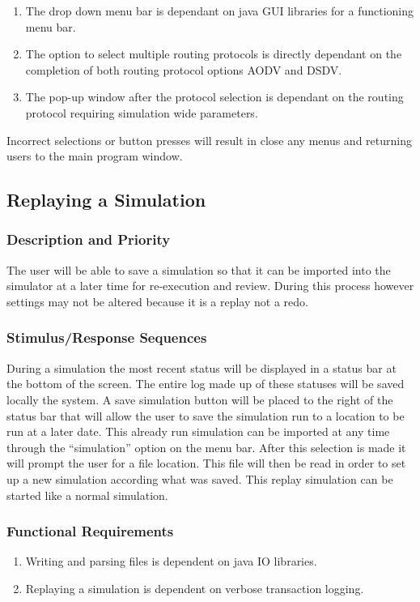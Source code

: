 \documentclass[a4paper,11pt,titlepage]{article}
\begin{document}
\begin{enumerate}[{\bf {REQ} 1}]
  \item The drop down menu bar is dependant on java GUI libraries for a functioning
  menu bar.
  \item The option to select multiple routing protocols is directly dependant on the
  completion of both routing protocol options AODV and DSDV.\\
  \item The pop-up window after the protocol selection is dependant on the routing
  protocol requiring simulation wide parameters.
\end{enumerate}
\begin{description}[\breaklabel]
\item[Errors] Incorrect selections or button presses will result in close any menus and
returning users to the main program window.
\end{description}

\subsection{Replaying a Simulation}
\subsubsection{Description and Priority}
The user will be able to save a simulation so that it can be imported into the simulator
at a later time for re-execution and review. During this process however settings may
not be altered because it is a replay not a redo.
\subsubsection{Stimulus/Response Sequences}
During a simulation the most recent status will be displayed in a status bar at the
bottom of the screen. The entire log made up of these statuses will be saved locally
the system. A save simulation button will be placed to the right of the status bar that
will allow the user to save the simulation run to a location to be run at a later date.
This already run simulation can be imported at any time through the “simulation” option
on the menu bar. After this selection is made it will prompt the user for a file location.
This file will then be read in order to set up a new simulation according what was
saved. This replay simulation can be started like a normal simulation.
\subsubsection{Functional Requirements}
\begin{enumerate}[{\bf {REQ} 1}]
  \item Writing and parsing files is dependent on java IO libraries.
  \item Replaying a simulation is dependent on verbose transaction logging.
\end{enumerate}
\end{document}
